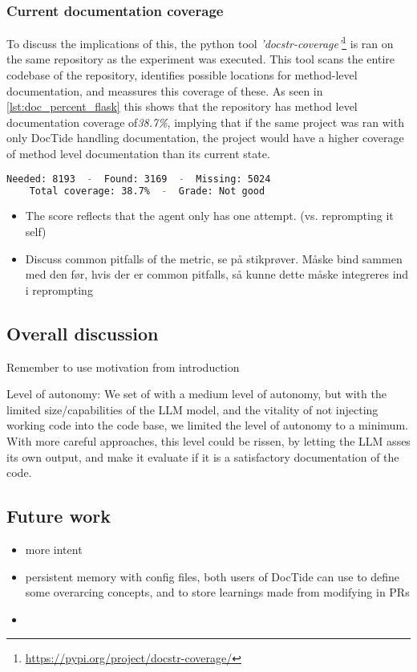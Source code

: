 \subsubsection*{Current documentation coverage}
To discuss the implications of this, the python tool \textit{'docstr-coverage'}\footnote{\url{https://pypi.org/project/docstr-coverage/}} is ran on the same repository as the experiment was executed. This tool scans the entire codebase of the repository, identifies possible locations for method-level documentation, and meassures this coverage of these. As seen in \cref{lst:doc_percent_flask} this shows that the repository has method level documentation coverage of\textit{38.7\%}, implying that if the same project was ran with only DocTide handling documentation, the project would have a higher coverage of method level documentation than its current state.

\begin{lstlisting}[language=sh, label={lst:doc_percent_flask},      caption= Ratio of method level documentation in flask repository]
    Needed: 8193  -  Found: 3169  -  Missing: 5024
    Total coverage: 38.7%  -  Grade: Not good
\end{lstlisting}
\begin{itemize}
    \item The score reflects that the agent only has one attempt. (vs. reprompting it self)
    \item Discuss common pitfalls of the metric, se på stikprøver. Måske bind sammen med den før, hvis der er common pitfalls, så kunne dette måske integreres ind i reprompting
\end{itemize}
\subsection{Overall discussion}
Remember to use motivation from introduction


Level of autonomy: We set of with a medium level of autonomy, but with the limited size/capabilities of the LLM model, and the vitality of not injecting working code into the code base, we limited the level of autonomy to a minimum. With more careful approaches, this level could be rissen, by letting the LLM asses its own output, and make it evaluate if it is a satisfactory documentation of the code.

\subsection{Future work}
\begin{itemize}
    \item more intent 
        \item persistent memory with config files, both users of DocTide can use to define some overarcing concepts, and to store learnings made from modifying in PRs
        \item 
\end{itemize}